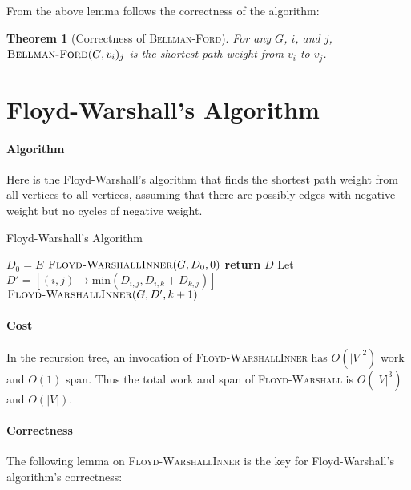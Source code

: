 \documentclass[11pt,a4paper,oneside,microtype,nokorean]{oblivoir}
\newtheorem{theorem}{Theorem}
\begin{document}
From the above lemma follows the correctness of the algorithm:

\begin{theorem}[Correctness of \textsc{Bellman-Ford}] For any $G$, $i$, and $j$,
  $\textsc{Bellman-Ford}(G,v_i)_{j}$ is the shortest path weight from $v_i$ to $v_j$.
\end{theorem}



\section{Floyd-Warshall's Algorithm}

\paragraph{Algorithm}

Here is the Floyd-Warshall's algorithm that finds the shortest path weight from all vertices to all
vertices, assuming that there are possibly edges with negative weight but no cycles of negative
weight.

\begin{algorithm}
  \caption{Floyd-Warshall's Algorithm}\label{dijkstra}
  \begin{algorithmic}[1]
     
    \State $D_0 = E$ 
    \State $\Call{Floyd-WarshallInner}{G,D_0,0}$
    \EndProcedure
    \Statex
     
    \State \textbf{return} $D$
    \EndIf
    \State Let $D' = [(i,j) \mapsto \textrm{min}(D_{i,j}, D_{i,k} + D_{k,j})]$
    \State $\Call{Floyd-WarshallInner}{G,D',k+1}$
    \EndProcedure
  \end{algorithmic}
\end{algorithm}


\paragraph{Cost}

In the recursion tree, an invocation of \textsc{Floyd-WarshallInner} has $O(|V|^2)$ work and $O(1)$
span.  Thus the total work and span of \textsc{Floyd-Warshall} is $O(|V|^3)$ and $O(|V|)$.


\paragraph{Correctness} The following lemma on \textsc{Floyd-WarshallInner} is the key for
Floyd-Warshall's algorithm's correctness:
\end{document}
